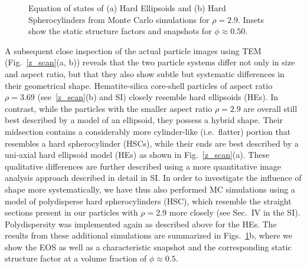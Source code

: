\documentclass[aps,prl,preprint,superscriptaddress,showkeys]{revtex4-2} %
\begin{document}
\begin{figure}[h]
\caption{Equation of states of (a) Hard Ellipsoids and (b) Hard Spherocylinders from Monte Carlo simulations for $\rho=2.9$. Insets show the static structure factors and snapshots for $\phi\approx 0.50$.}\label{fig:sim}
\end{figure}
A subsequent close inspection of the actual particle images using TEM (Fig.~\ref{z_scan}(a, b)) reveals that the two particle systems differ not only in size and aspect ratio, but that they also show subtle but systematic differences in their geometrical shape. Hematite-silica core-shell particles of aspect ratio $\rho=3.69$  (see~\ref{z_scan}(b) and SI) closely resemble hard ellipsoids (HEs). In contrast, while the particles with the smaller aspect ratio $\rho=2.9$ are overall still best described by a model of an ellipsoid, they possess a hybrid shape. Their midsection contains a considerably more cylinder-like (i.e.~flatter) portion that resembles a hard spherocylinder (HSCs), while their ends are best described by a uni-axial hard ellipsoid model (HEs) as shown in Fig.~\ref{z_scan}(a). These qualitative differences are further described using a more quantitative image analysis approach described in detail in SI. In order to investigate the influence of shape more systematically, we have thus also performed MC simulations using a model of polydisperse hard spherocylinders (HSC), which resemble the straight sections present in our particles with $\rho=2.9$ more closely (see Sec.~IV in the SI). Polydispersity was implemented again as described above for the HEs. The results from these additional simulations are summarized in Figs.~\ref{fig:sim}b, where we show the EOS as well as a characteristic snapshot and the corresponding static structure factor at a volume fraction of $\phi \approx 0.5$.\par
\end{document}
